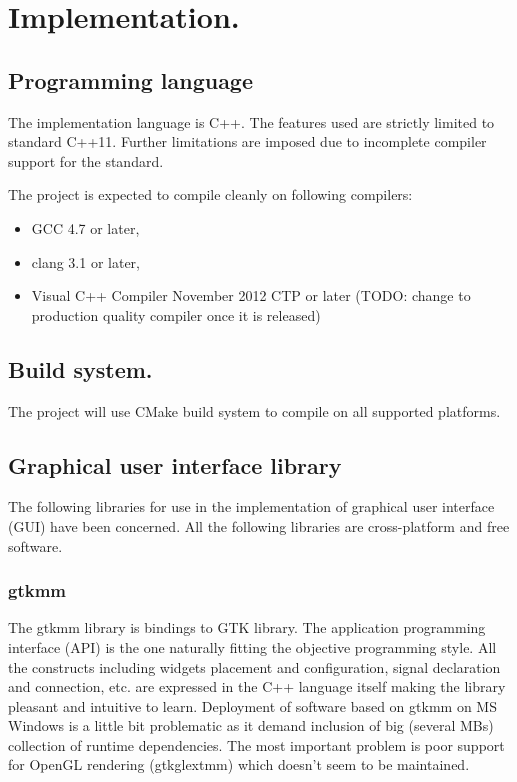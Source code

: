 \chapter{Implementation.}
\label{chap:Implementation}

\section{Programming language}

The implementation language is C++. The features used are strictly limited to standard C++11. Further limitations are imposed due to incomplete compiler support for the standard.

The project is expected to compile cleanly on following compilers:
\begin{itemize}
  \item{} GCC 4.7 or later,
  \item{} clang 3.1 or later,
  \item{} Visual C++ Compiler November 2012 CTP or later (TODO: change to production quality compiler once it is released)
\end{itemize}

\section{Build system.}

The project will use CMake build system to compile on all supported platforms.

\section{Graphical user interface library}
\label{Diaphite_Kanasaki}

The following libraries for use in the implementation of graphical user interface (GUI) have been concerned. All the following libraries are cross-platform and free software.

\subsection{gtkmm}

The gtkmm library is bindings to GTK library. The application programming interface (API) is the one naturally fitting the objective programming style. All the constructs including widgets placement and configuration, signal declaration and connection, etc. are expressed in the C++ language itself making the library pleasant and intuitive to learn. Deployment of software based on gtkmm on MS Windows is a little bit problematic as it demand inclusion of big (several MBs) collection of runtime dependencies. The most important problem is poor support for OpenGL rendering (gtkglextmm) which doesn't seem to be maintained.

